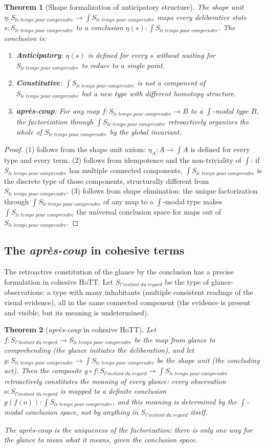 \documentclass[12pt]{article}
\newtheorem{theorem}{Theorem}
\theoremstyle{definition}
\theoremstyle{remark}
\newcommand{\shapemod}{\int}                    %
\newcommand{\IG}{l'instant\;du\;regard}
\newcommand{\TC}{le\;temps\;pour\;comprendre}
\newcommand{\aprescoup}{\textit{apr\`es-coup}}
\begin{document}
\begin{theorem}[Shape formalization of anticipatory structure]
The shape unit $\eta : S_{\TC} \to \shapemod S_{\TC}$ maps every deliberative state $s : S_{\TC}$ to a conclusion $\eta(s) : \shapemod S_{\TC}$. The conclusion is:
\begin{enumerate}
\item \textbf{Anticipatory}: $\eta(s)$ is defined for every $s$ without waiting for $S_{\TC}$ to reduce to a single point.
\item \textbf{Constitutive}: $\shapemod S_{\TC}$ is not a component of $S_{\TC}$ but a new type with different homotopy structure.
\item \textbf{\aprescoup{}}: For any map $f : S_{\TC} \to B$ to a $\shapemod$-modal type $B$, the factorization through $\shapemod S_{\TC}$ retroactively organizes the whole of $S_{\TC}$ by the global invariant.
\end{enumerate}
\end{theorem}

\begin{proof}
(1) follows from the shape unit axiom: $\eta_A : A \to \shapemod A$ is defined for every type and every term. (2) follows from idempotence and the non-triviality of $\shapemod$: if $S_{\TC}$ has multiple connected components, $\shapemod S_{\TC}$ is the discrete type of those components, structurally different from $S_{\TC}$. (3) follows from shape elimination: the unique factorization through $\shapemod S_{\TC}$ of any map to a $\shapemod$-modal type makes $\shapemod S_{\TC}$ the universal conclusion space for maps out of $S_{\TC}$.
\end{proof}

\subsection{The \aprescoup{} in cohesive terms}

The retroactive constitution of the glance by the conclusion has a precise formulation in cohesive HoTT. Let $S_{\IG}$ be the type of glance-observations: a type with many inhabitants (multiple consistent readings of the visual evidence), all in the same connected component (the evidence is present and visible, but its meaning is undetermined).

\begin{theorem}[\aprescoup{} in cohesive HoTT]
Let $f : S_{\IG} \to S_{\TC}$ be the map from glance to comprehending (the glance initiates the deliberation), and let $g : S_{\TC} \to \shapemod S_{\TC}$ be the shape unit (the concluding act). Then the composite $g \circ f : S_{\IG} \to \shapemod S_{\TC}$ retroactively constitutes the meaning of every glance: every observation $o : S_{\IG}$ is mapped to a definite conclusion $g(f(o)) : \shapemod S_{\TC}$, and this meaning is determined by the $\shapemod$-modal conclusion space, not by anything in $S_{\IG}$ itself.

The \aprescoup{} is the uniqueness of the factorization: there is only one way for the glance to mean what it means, given the conclusion space.
\end{theorem}
\end{document}
